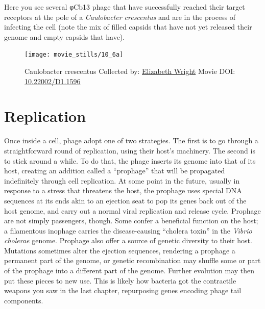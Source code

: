 \documentclass[]{tufte-book}
\begin{document}
Here you see several φCb13 phage that have successfully reached their
target receptors at the pole of a \emph{Caulobacter crescentus} and are
in the process of infecting the cell (note the mix of filled capsids
that have not yet released their genome and empty capsids that have).





\begin{figure}
\texttt{[image: movie\_stills/10\_6a]} \caption[Caulobacter crescentus Collected by:
\protect\hyperlink{elizabeth_wright}{Elizabeth Wright} Movie DOI:
\href{https://doi.org/10.22002/D1.1596}{10.22002/D1.1596}]{Caulobacter crescentus Collected by:
\protect\hyperlink{elizabeth_wright}{Elizabeth Wright} Movie DOI:
\href{https://doi.org/10.22002/D1.1596}{10.22002/D1.1596}}\label{fig:10-6a}
\end{figure}

\section{Replication}\label{replication}

Once inside a cell, phage adopt one of two strategies. The first is to
go through a straightforward round of replication, using their host's
machinery. The second is to stick around a while. To do that, the phage
inserts its genome into that of its host, creating an addition called a
``prophage'' that will be propagated indefinitely through cell
replication. At some point in the future, usually in response to a
stress that threatens the host, the prophage uses special DNA sequences
at its ends akin to an ejection seat to pop its genes back out of the
host genome, and carry out a normal viral replication and release cycle.
Prophage are not simply passengers, though. Some confer a beneficial
function on the host; a filamentous inophage carries the disease-causing
``cholera toxin'' in the \emph{Vibrio cholerae} genome. Prophage also
offer a source of genetic diversity to their host. Mutations sometimes
alter the ejection sequences, rendering a prophage a permanent part of
the genome, or genetic recombination may shuffle some or part of the
prophage into a different part of the genome. Further evolution may then
put these pieces to new use. This is likely how bacteria got the
contractile weapons you saw in the last chapter, repurposing genes
encoding phage tail components.
\end{document}
